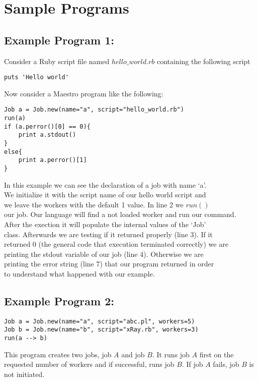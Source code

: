 \section{Sample Programs}
\label{sect:samples}
\subsection*{Example Program 1:}
Consider a Ruby script file named $hello\_world.rb$ containing the following script
\begin{verbatim}
puts 'Hello world'
\end{verbatim}

Now consider a Maestro program like the following:
\begin{verbatim}
Job a = Job.new(name="a", script="hello_world.rb")
run(a)
if (a.perror()[0] == 0){
    print a.stdout()
}
else{
    print a.perror()[1]
}
\end{verbatim}
In this example we can see the declaration of a job with name `a'.\\
We initialize it with the script name of our hello world script and\\
we leave the workers with the default 1 value. In line 2 we $run()$\\
our job. Our language will find a not loaded worker and run our command.\\
After the exection it will populate the internal values of the `Job'\\
class. Afterwards we are testing if it returned properly (line 3). If it\\
returned 0 (the general code that execution terminated correctly) we are\\
printing the stdout variable of our job (line 4). Otherwise we are\\
printing the error string (line 7) that our program returned in order\\
to understand what happened with our example.\\

\subsection*{Example Program 2:}
\begin{verbatim}
Job a = Job.new(name="a", script="abc.pl", workers=5)
Job b = Job.new(name="b", script="xRay.rb", workers=3)
run(a --> b)
\end{verbatim}

This program creates two jobs, job $A$ and job $B$. It runs job $A$ first on the requested number of workers
and if successful, runs job $B$. If job $A$ fails, job $B$ is not initiated.
\\

